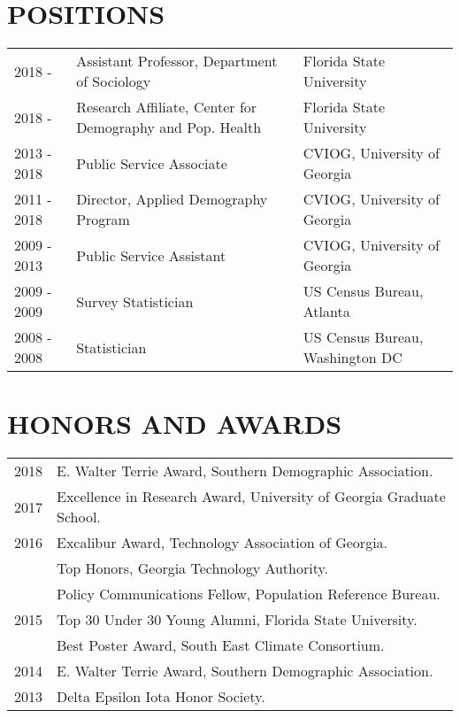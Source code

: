 \documentclass[letterpaper,11pt]{article}
\begin{document}
\section{POSITIONS}
\begin{tabular}{lll}
2018 - & Assistant Professor, Department of Sociology & Florida State University\\
2018 - & Research Affiliate, Center for Demography and Pop. Health & Florida State University\\
2013 - 2018 & Public Service Associate & CVIOG, University of Georgia\\
2011 - 2018 & Director, Applied Demography Program & CVIOG, University of Georgia\\
2009 - 2013 & Public Service Assistant & CVIOG, University of Georgia\\
2009 - 2009 & Survey Statistician & US Census Bureau, Atlanta\\
2008 - 2008 & Statistician & US Census Bureau, Washington DC\\
\end{tabular}


\section{HONORS AND AWARDS}
\begin{tabular}{ll}
2018 & E. Walter Terrie Award, Southern Demographic Association.\\
2017 & Excellence in Research Award, University of Georgia Graduate School. \\
2016 & Excalibur Award, Technology Association of Georgia.\\
 & Top Honors, Georgia Technology Authority.\\
 & Policy Communications Fellow, Population Reference Bureau.\\
2015 & Top 30 Under 30 Young Alumni, Florida State University.\\
 & Best Poster Award, South East Climate Consortium.\\
2014 & E. Walter Terrie Award, Southern Demographic Association.\\
2013 & Delta Epsilon Iota Honor Society.\\
\end{tabular}
\end{document}
